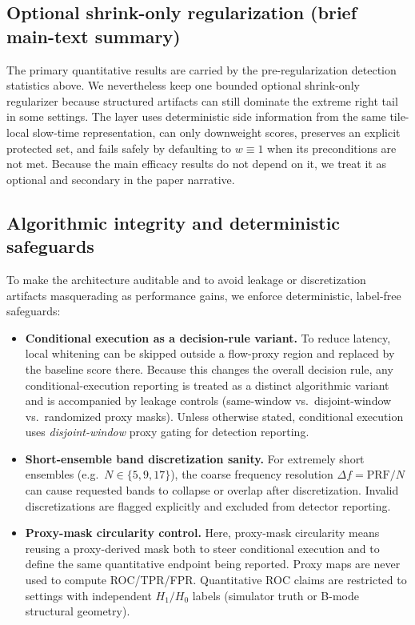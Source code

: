 \documentclass[11pt]{article}
\newif\ifPAPERONLY
\begin{document}
\ifPAPERONLY\else
\subsection{Optional shrink-only regularization (brief main-text summary)}
\noindent The primary quantitative results are carried by the pre-regularization detection statistics above. We nevertheless keep one bounded optional shrink-only regularizer because structured artifacts can still dominate the extreme right tail in some settings. The layer uses deterministic side information from the same tile-local slow-time representation, can only downweight scores, preserves an explicit protected set, and fails safely by defaulting to $w\equiv 1$ when its preconditions are not met. Because the main efficacy results do not depend on it, we treat it as optional and secondary in the paper narrative.
\fi

\ifPAPERONLY
\else
\subsection{Algorithmic integrity and deterministic safeguards}
To make the architecture auditable and to avoid leakage or discretization artifacts masquerading as performance gains, we enforce deterministic, label-free safeguards:
\begin{itemize}[nosep]
  \item \textbf{Conditional execution as a decision-rule variant.} To reduce latency, local whitening can be skipped outside a flow-proxy region and replaced by the baseline score there. Because this changes the overall decision rule, any conditional-execution reporting is treated as a distinct algorithmic variant and is accompanied by leakage controls (same-window vs.\ disjoint-window vs.\ randomized proxy masks). Unless otherwise stated, conditional execution uses \emph{disjoint-window} proxy gating for detection reporting.
  \item \textbf{Short-ensemble band discretization sanity.} For extremely short ensembles (e.g.\ $N\in\{5,9,17\}$), the coarse frequency resolution $\Delta f=\mathrm{PRF}/N$ can cause requested bands to collapse or overlap after discretization. Invalid discretizations are flagged explicitly and excluded from detector reporting.
  \item \textbf{Proxy-mask circularity control.} Here, proxy-mask circularity means reusing a proxy-derived mask both to steer conditional execution and to define the same quantitative endpoint being reported. Proxy maps are never used to compute ROC/TPR/FPR. Quantitative ROC claims are restricted to settings with independent $H_1/H_0$ labels (simulator truth or B-mode structural geometry).
\end{itemize}
\end{document}
